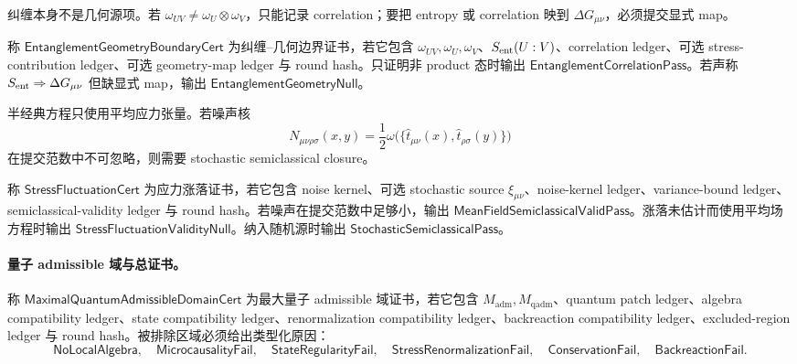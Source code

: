 纠缠本身不是几何源项。若 \(\omega_{UV}\neq\omega_U\otimes\omega_V\)，只能记录 correlation；要把 entropy 或 correlation 映到 \(\Delta G_{\mu\nu}\)，必须提交显式 map。

\begin{definition}[纠缠--几何边界证书]\label{def:typed-address-biaxial-completion-entanglement-geometry-boundary-cert}
称 \(\mathsf{EntanglementGeometryBoundaryCert}\) 为纠缠--几何边界证书，若它包含 \(\omega_{UV},\omega_U,\omega_V\)、\(S_{\rm ent}(U:V)\)、correlation ledger、可选 stress-contribution ledger、可选 geometry-map ledger 与 round hash。只证明非 product 态时输出 \(\mathsf{EntanglementCorrelationPass}\)。若声称 \(S_{\rm ent}\Rightarrow\Delta G_{\mu\nu}\) 但缺显式 map，输出 \(\mathsf{EntanglementGeometryNull}\)。
\end{definition}

半经典方程只使用平均应力张量。若噪声核
\[
N_{\mu\nu\rho\sigma}(x,y)
=
\frac12\omega\bigl(\{\widehat t_{\mu\nu}(x),\widehat t_{\rho\sigma}(y)\}\bigr)
\]
在提交范数中不可忽略，则需要 stochastic semiclassical closure。

\begin{definition}[应力涨落证书]\label{def:typed-address-biaxial-completion-stress-fluctuation-cert}
称 \(\mathsf{StressFluctuationCert}\) 为应力涨落证书，若它包含 noise kernel、可选 stochastic source \(\xi_{\mu\nu}\)、noise-kernel ledger、variance-bound ledger、semiclassical-validity ledger 与 round hash。若噪声在提交范数中足够小，输出 \(\mathsf{MeanFieldSemiclassicalValidPass}\)。涨落未估计而使用平均场方程时输出 \(\mathsf{StressFluctuationValidityNull}\)。纳入随机源时输出 \(\mathsf{StochasticSemiclassicalPass}\)。
\end{definition}

\paragraph{量子 admissible 域与总证书。}
\begin{definition}\label{def:typed-address-biaxial-completion-maximal-quantum-admissible-domain-cert}
称 \(\mathsf{MaximalQuantumAdmissibleDomainCert}\) 为最大量子 admissible 域证书，若它包含 \(M_{\mathrm{adm}},M_{\mathrm{qadm}}\)、quantum patch ledger、algebra compatibility ledger、state compatibility ledger、renormalization compatibility ledger、backreaction compatibility ledger、excluded-region ledger 与 round hash。被排除区域必须给出类型化原因：
\[
\mathsf{NoLocalAlgebra},\quad
\mathsf{MicrocausalityFail},\quad
\mathsf{StateRegularityFail},\quad
\mathsf{StressRenormalizationFail},\quad
\mathsf{ConservationFail},\quad
\mathsf{BackreactionFail}.
\]
\end{definition}

